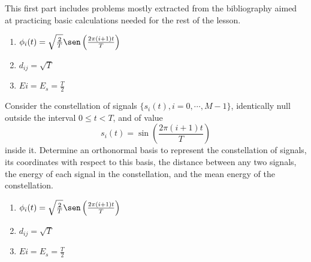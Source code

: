 \documentclass[es,boletin]{uah}
\begin{document}
{
	This first part includes problems mostly extracted from the bibliography aimed at practicing basic calculations needed for the rest of the lesson.

}



{
	\begin{enumerate}
		\item $\phi_i(t) = \sqrt{\frac{2}{T}} \sen\left ( \frac{2\pi(i+1)t}{T} \right )$
 	 	\item $d_{ij} = \sqrt{T}$
    	\item $Ei = E_s = \frac{T}{2}$	
	\end{enumerate}
}
{
	\cite{Artes} Consider the constellation of signals $\{s_i(t), i=0,\cdots , M-1\}$, identically null outside the interval $0\leq t<T$, and of value
	\begin{displaymath}
	s_i(t) = \sin\left ( \frac{2\pi(i+1)t}{T} \right )
	\end{displaymath}
	inside it. Determine an orthonormal basis to represent the constellation of signals, its coordinates with respect to this basis, the distance between any two signals, the energy of each signal in the constellation, and the mean energy of the constellation.
}
{
	\begin{enumerate}
		\item $\phi_i(t) = \sqrt{\frac{2}{T}} \sen\left ( \frac{2\pi(i+1)t}{T} \right )$
 	 	\item $d_{ij} = \sqrt{T}$
    	\item $Ei = E_s = \frac{T}{2}$	
	\end{enumerate}
}
\end{document}
